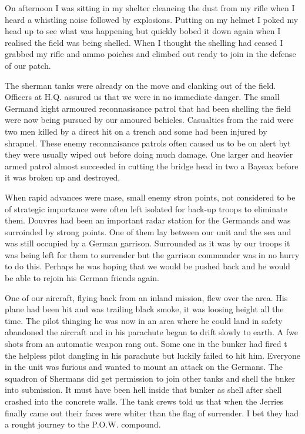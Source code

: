 On afternoon I was sitting in my shelter cleaneing the dust from my
rifle when I heard a whistling noise followed by explosions. Putting
on my helmet I poked my head up to see what was happening but quickly
bobed it down again when I realised the field was being shelled. When
I thought the shelling had ceased I grabbed my rifle and ammo poiches
and climbed out ready to join in the defense of our patch.

The sherman tanks were already on the move and clanking out of the
field. Officers at H.Q. assured us that we were in no immediate
danger. The small Germand kight armoured reconnasisance patrol that
had been shelling the field were now being pursued by our amoured
behicles. Casualties from the raid were two men killed by a direct hit
on a trench and some had been injured by shrapnel. These enemy
reconnaisance patrols often caused us to be on alert byt they were
usually wiped out before doing much damage. One larger and heavier
armed patrol almost succeeded in cutting the bridge head in two a
Bayeax before it was broken up and destroyed.

When rapid advances were mase, small enemy stron points, not
considered to be of strategic importance were often left isolated for
back-up troops to eliminate them. Douvres had been an important radar
station for the Germands and was surroinded by strong points. One of
them lay between our unit and the sea and was still occupied by a
German garrison. Surrounded as it was by our troops it was being left
for them to surrender but the garrison commander was in no hurry to do
this. Perhaps he was hoping that we would be pushed back and he would
be able to rejoin his German friends again.

One of our aircraft, flying back from an inland mission, flew over the
area. His plane had been hit and was trailing black smoke, it was
loosing height all the time. The pilot thinging he was now in an area
where he could land in safety abandoned the aircraft and in his
parachute began to drift slowly to earth. A fwe shots from an
automatic weapon rang out. Some one in the bunker had fired t the
helpless pilot dangling in his parachute but luckily failed to hit
him. Everyone in the unit was furious and wanted to mount an attack on
the Germans. The squadron of Shermans did get permission to join other
tanks and shell the bnker into submission. It must have been hell
inside that bunker as shell after shell crashed into the concrete
walls. The tank crews told us that when the Jerries finally came out
their faces were whiter than the flag of surrender. I bet they had a
rought journey to the P.O.W. compound.


